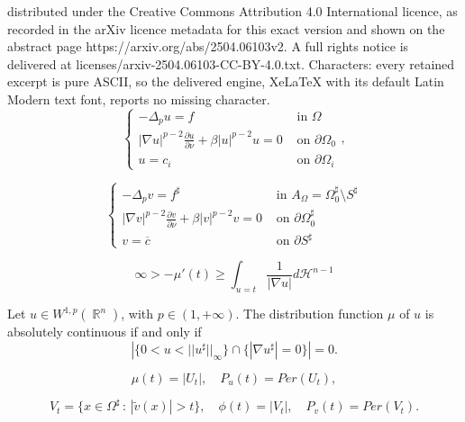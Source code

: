 \documentclass[10pt,a4paper]{amsart}
\DeclareMathOperator{\R}{\mathbb{R}}
\newcommand{\abs}[1]{{\left|#1\right|}}
\begin{document}
distributed under the Creative Commons Attribution 4.0 International licence, as recorded in the arXiv licence metadata for this exact version and shown on the abstract page https://arxiv.org/abs/2504.06103v2. A full rights notice is delivered at licenses/arxiv-2504.06103-CC-BY-4.0.txt. Characters: every retained excerpt is pure ASCII, so the delivered engine, XeLaTeX with its default Latin Modern text font, reports no missing character.
\begin{equation}\label{prob}
    \begin{cases}
        -\Delta_p u=f &\text{ in } \Omega\\
        \abs{\nabla u}^{p-2}\frac{\partial u}{\partial\nu}+\beta \abs{u}^{p-2}u=0 &\text{ on }\partial\Omega_0 \\
        u=c_i&\text{ on }\partial\Omega_i
    \end{cases},
\end{equation}

\begin{equation}\label{probsymm}
    \begin{cases}
        -\Delta_p v=f^\sharp &\text{ in } A_\Omega=\Omega_0^\sharp\setminus S^\sharp\\
        \abs{\nabla v}^{p-2}\frac{\partial v}{\partial\nu}+\beta \abs{v}^{p-2}v=0 &\text{ on }\partial\Omega_0^\sharp \\
        v=\overline c &\text{ on }\partial S^\sharp
    \end{cases}
\end{equation}

    \begin{equation}\label{brothers1}
        \infty>-\mu'(t)\geq\displaystyle \int_{u=t}\dfrac{1}{|\nabla u|}d\mathcal{H}^{n-1}
    \end{equation}

\begin{lemma}\label{Broz}
Let $u\in W^{1,p}(\R^n)$, with $p\in(1,+\infty)$. The distribution function $\mu$ of $u$ is absolutely continuous if and only if 
\begin{equation*}
    \abs{\{0<u<  ||u^\sharp||_\infty\}\cap \{|\nabla u^\sharp| =0\}}=0.
\end{equation*}
\end{lemma}

\begin{equation}\label{distribuzioemu}
    \mu(t)=\abs{U_t},\quad P_u(t)=Per(U_t),
\end{equation}

\begin{equation}\label{distribuzionephi}
    V_t=\{x\in\Omega^\sharp\,:\,|\tilde v(x)|>t\},\quad
    \phi(t)=\abs{V_t},\quad P_v(t)=Per(V_t).
\end{equation}
\end{document}
